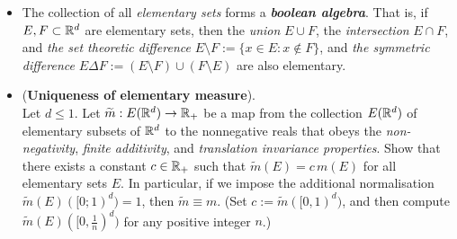 \documentclass[11pt]{article}
\begin{document}
\begin{itemize}
\item \begin{remark}
The collection of all \emph{elementary sets} forms a \emph{\textbf{boolean algebra}}. That is, if $E, F \subset {\mathbb R}^d$ are elementary sets, then the \emph{union} $E \cup F$, the \emph{intersection} $E \cap F$, and \emph{the set theoretic difference} $E \setminus F := \{x \in E : x \not\in F \}$, and \emph{the symmetric difference} $E \Delta F := ( E \setminus F ) \cup (F \setminus E)$ are also elementary.
\end{remark}

\item \begin{exercise} (\textbf{Uniqueness of elementary measure}). \citep{tao2011introduction}\\
Let $d \le 1$. Let $\widetilde{m} : E({\mathbb R}^d) \rightarrow {\mathbb R}_{+}$ be a map from the collection $E({\mathbb R}^d)$ of elementary subsets of ${\mathbb R}^d$ to the nonnegative reals that obeys the \emph{non-negativity}, \emph{finite additivity}, and \emph{translation invariance properties}. Show that
there exists a constant $c \in {\mathbb R}_{+}$ such that $\widetilde{m}(E) = c\,m(E)$ for all elementary sets $E$. In particular, if we impose the additional normalisation $\widetilde{m}(E)([0; 1)^d) = 1$, then $\widetilde{m} \equiv m$. (Set $c := \widetilde{m}([0, 1)^d) $, and then compute $\widetilde{m}(E)([0, \frac{1}{n})^d)$ for any positive integer $n$.)
\end{exercise}
\end{itemize}
 
 
\end{document}
